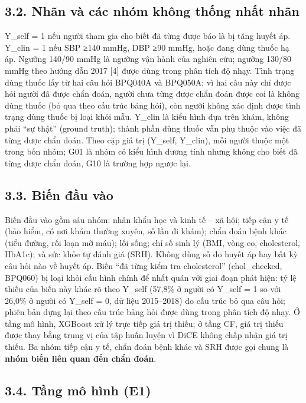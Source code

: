 \documentclass[9pt,a4paper]{extarticle}
\begin{document}
\subsection{3.2. Nhãn và các nhóm không thống nhất nhãn}

Y\_self = 1 nếu người tham gia cho biết đã từng được báo là bị tăng
huyết áp. Y\_clin = 1 nếu SBP ≥140 mmHg, DBP ≥90 mmHg, hoặc đang dùng
thuốc hạ áp. Ngưỡng 140/90 mmHg là ngưỡng vận hành của nghiên cứu;
ngưỡng 130/80 mmHg theo hướng dẫn 2017 {[}4{]} được dùng trong phân tích
độ nhạy. Tình trạng dùng thuốc lấy từ hai câu hỏi BPQ040A và BPQ050A; vì
hai câu này chỉ được hỏi người đã được chẩn đoán, người chưa từng được
chẩn đoán được coi là không dùng thuốc (bỏ qua theo cấu trúc bảng hỏi),
còn người không xác định được tình trạng dùng thuốc bị loại khỏi mẫu.
Y\_clin là kiểu hình dựa trên khám, không phải ``sự thật'' (ground
truth); thành phần dùng thuốc vẫn phụ thuộc vào việc đã từng được chẩn
đoán. Theo cặp giá trị (Y\_self, Y\_clin), mỗi người thuộc một trong bốn
nhóm; G01 là nhóm có kiểu hình dương tính nhưng không cho biết đã từng
được chẩn đoán, G10 là trường hợp ngược lại.

\subsection{3.3. Biến đầu vào}

Biến đầu vào gồm sáu nhóm: nhân khẩu học và kinh tế -- xã hội; tiếp cận
y tế (bảo hiểm, có nơi khám thường xuyên, số lần đi khám); chẩn đoán
bệnh khác (tiểu đường, rối loạn mỡ máu); lối sống; chỉ số sinh lý (BMI,
vòng eo, cholesterol, HbA1c); và sức khỏe tự đánh giá (SRH). Không dùng
số đo huyết áp hay bất kỳ câu hỏi nào về huyết áp. Biến ``đã từng kiểm
tra cholesterol'' (chol\_checked, BPQ060) bị loại khỏi cấu hình chính để
nhất quán với giai đoạn phát hiện: tỷ lệ thiếu của biến này khác rõ theo
Y\_self (57,8\% ở người có Y\_self = 1 so với 26,0\% ở người có Y\_self
= 0, dữ liệu 2015--2018) do cấu trúc bỏ qua câu hỏi; phiên bản dựng lại
theo cấu trúc bảng hỏi được dùng trong phân tích độ nhạy. Ở tầng mô
hình, XGBoost xử lý trực tiếp giá trị thiếu; ở tầng CF, giá trị thiếu
được thay bằng trung vị của tập huấn luyện vì DiCE không chấp nhận giá
trị thiếu. Ba nhóm tiếp cận y tế, chẩn đoán bệnh khác và SRH được gọi
chung là \textbf{nhóm biến liên quan đến chẩn đoán}.

\subsection{3.4. Tầng mô hình (E1)}
\end{document}
